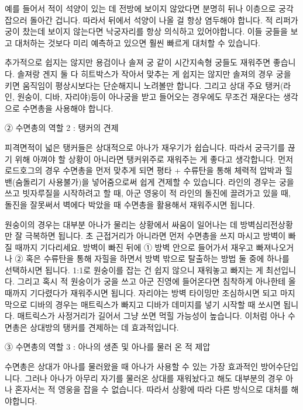  

예를 들어서 적이 석양이 있는 데 전방에 보이지 않았다면 분명히 뒤나 이층으로 궁각잡으러 돌아간 겁니다. 따라서 뒤에서 석양이 나올 걸 항상 염두해야 합니다. 적 리퍼가 궁이 찼는데 보이지 않는다면 낙궁자리를 항상 의식하고 있어야합니다. 이들 궁들을 보고 대처하는 것보다 미리 예측하고 있으면 훨씬 빠르게 대처할 수 있습니다.

 

추가적으로 쉽지는 않지만 용검이나 솔져 궁 같이 시간지속형 궁들도 재워주면 좋습니다. 솔져랑 겐지 둘 다 히트박스가 작아서 맞추는 게 쉽지는 않지만 솔져의 경우 궁을 키면 움직임이 평상시보다는 단순해지니 노려볼만 합니다. 그리고 상대 주요 탱커(라인, 원숭이, 디바, 자리야)등이 아나궁을 받고 들어오는 경우에도 무조건 재운다는 생각으로 수면총을 사용해야 합니다.

 

② 수면총의 역할 2 : 탱커의 견제

 

피격면적이 넓은 탱커들은 상대적으로 아나가 재우기가 쉽습니다. 따라서 궁극기를 끊기 위해 아껴야 할 상황이 아니라면 탱커위주로 재워주는 게 좋다고 생각합니다. 먼저 로드호그의 경우 수면총을 먼저 맞추게 되면 평타 + 수류탄을 통해 체력적 압박과 힐밴(숨돌리기 사용불가)을 넣어줌으로써 쉽게 견제할 수 있습니다. 라인의 경우는 궁을 쓰고 빗자루질을 시작하려고 할 때, 아군 영웅이 적 라인의 돌진에 끌려가고 있을 때, 돌진을 잘못써서 벽에다 박았을 때 수면총을 활용해서 재워주시면 됩니다.

 

원숭이의 경우는 대부분 아나가 물리는 상황에서 싸움이 일어나는 데 방벽심리전상황만 잘 극복하면 됩니다. 초 근접거리가 아니라면 먼저 수면총을 쓰지 마시고 방벽이 빠질 때까지 기다리세요. 방벽이 빠진 뒤에 ① 방벽 안으로 들어가서 재우고 빠져나오거나 ② 혹은 수류탄을 통해 자힐을 하면서 방벽 밖으로 탈출하는 방법 둘 중에 하나를 선택하시면 됩니다. 1:1로 원숭이를 잡는 건 쉽지 않으니 재워놓고 빠지는 게 최선입니다. 그리고 혹시 적 원숭이가 궁을 쓰고 아군 진영에 들어온다면 침착하게 아나한테 올 때까지 기다렸다가 재워주시면 됩니다. 자리야는 방벽 타이밍만 조심하시면 되고 마지막으로 디바의 경우는 매트릭스가 빠지고 디바가 데미지를 넣기 시작할 때 쏘시면 됩니다. 매트릭스가 사정거리가 길어서 그냥 쏘면 먹힐 가능성이 높습니다. 이처럼 아나 수면총은 상대방의 탱커를 견제하는 데 효과적입니다.

 

③ 수면총의 역할 3 : 아나의 생존 및 아나를 물러 온 적 제압

 

수면총은 상대가 아나를 물러왔을 때 아나가 사용할 수 있는 가장 효과적인 방어수단입니다. 그러나 아나가 아무리 자기를 물러온 상대를 재워놨다고 해도 대부분의 경우 아나 혼자서는 적 영웅을 잡을 수 없습니다. 따라서 상황에 따라 다른 방식으로 대처를 해야합니다.

